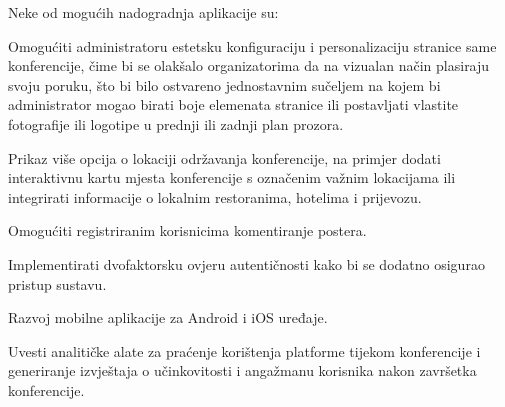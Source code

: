 		
		Neke od mogućih nadogradnja aplikacije su: 
		\begin{packed_item}
			\item Omogućiti administratoru estetsku konfiguraciju i personalizaciju stranice same konferencije, čime bi se olakšalo organizatorima da na vizualan način plasiraju svoju poruku, što bi bilo ostvareno jednostavnim sučeljem na kojem bi administrator mogao birati boje elemenata stranice ili postavljati vlastite fotografije ili logotipe u prednji ili zadnji plan prozora.
			\item Prikaz više opcija o lokaciji održavanja konferencije, na primjer dodati  interaktivnu kartu mjesta konferencije s označenim važnim lokacijama ili integrirati informacije o lokalnim restoranima, hotelima i prijevozu.
			\item Omogućiti registriranim korisnicima komentiranje postera.
			\item Implementirati dvofaktorsku ovjeru autentičnosti kako bi se dodatno osigurao pristup sustavu.
			\item Razvoj mobilne aplikacije za Android i iOS uređaje. 
			\item Uvesti analitičke alate za praćenje korištenja platforme tijekom konferencije i generiranje izvještaja o učinkovitosti i angažmanu korisnika nakon završetka konferencije.
		\end{packed_item}

		\eject
		
